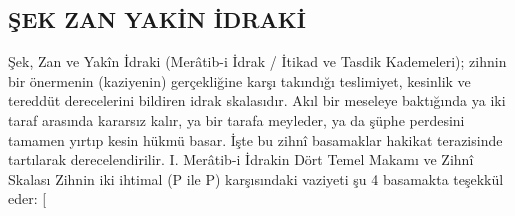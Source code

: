 \documentclass[11pt,a4paper]{article}
\begin{document}
\subsection{ŞEK ZAN YAKİN İDRAKİ}



Şek, Zan ve Yakîn İdraki (Merâtib-i İdrak / İtikad ve Tasdik Kademeleri); zihnin bir önermenin (kaziyenin) gerçekliğine karşı takındığı teslimiyet, kesinlik ve tereddüt derecelerini bildiren idrak skalasıdır.
Akıl bir meseleye baktığında ya iki taraf arasında kararsız kalır, ya bir tarafa meyleder, ya da şüphe perdesini tamamen yırtıp kesin hükmü basar. İşte bu zihnî basamaklar hakikat terazisinde tartılarak derecelendirilir.
I. Merâtib-i İdrakin Dört Temel Makamı ve Zihnî Skalası
Zihnin iki ihtimal (P ile \neg P) karşısındaki vaziyeti şu 4 basamakta teşekkül eder:
[ %
\end{document}
